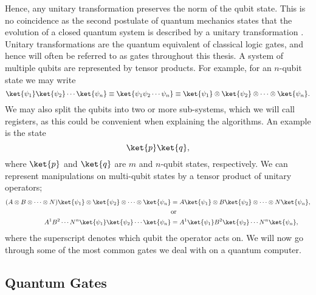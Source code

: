 Hence, any unitary transformation preserves the norm of the qubit state. This is no coincidence as the second postulate of quantum mechanics states that the evolution of a closed quantum system is described by a unitary transformation \cite{NielsenAndChuang}. Unitary transformations are the quantum equivalent of classical logic gates, and hence will often be referred to as gates throughout this thesis. 
A system of multiple qubits are represented by tensor products. For example, for an $n$-qubit state we may write
\begin{equation}
    \label{eq:TensorProduct}
    \ket{\psi_1}\ket{\psi_2}\cdots \ket{\psi_n} \equiv \ket{\psi_1 \psi_2 \cdots \psi_n} \equiv \ket{\psi_1} \otimes \ket{\psi_2} \otimes \cdots \otimes \ket{\psi_n}.
\end{equation}
We may also split the qubits into two or more sub-systems, which we will call registers, as this could be convenient when explaining the algorithms. An example is the state
\begin{equation*}
    \ket{p}\ket{q},
\end{equation*}
where $\ket{p}$ and $\ket{q}$ are $m$ and $n$-qubit states, respectively.
We can represent manipulations on multi-qubit states by a tensor product of unitary operators;
\begin{align}
    \label{eq:QuantumGates}
    (A \otimes B \otimes \cdots \otimes N ) \ket{\psi_1} \otimes \ket{\psi_2} \otimes \cdots \otimes \ket{\psi_n} &= A\ket{\psi_1} \otimes B\ket{\psi_2} \otimes \cdots \otimes N \ket{\psi_n}, \notag \\
    &\text{or} \notag \\
    A^1 B^2\cdots N^n \ket{\psi_1}\ket{\psi_2}\cdots \ket{\psi_n} &= A^1\ket{\psi_1}B^2\ket{\psi_2}\cdots N^n\ket{\psi_n},
\end{align}
where the superscript denotes which qubit the operator acts on.
We will now go through some of the most common gates we deal with on a quantum computer. 

\subsection{Quantum Gates}
\label{subsec:QCQuantumGates}

